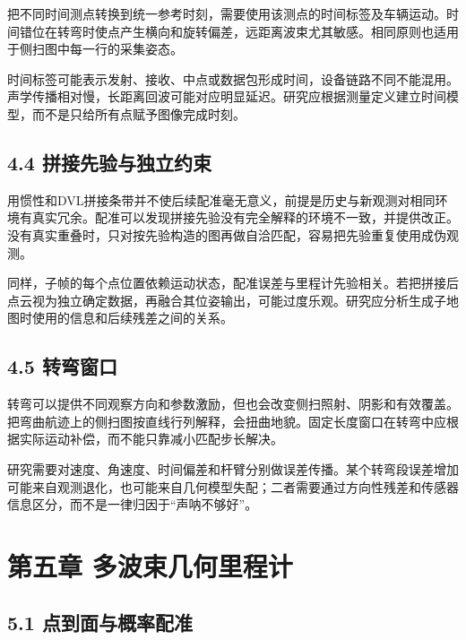 把不同时间测点转换到统一参考时刻，需要使用该测点的时间标签及车辆运动。时间错位在转弯时使点产生横向和旋转偏差，远距离波束尤其敏感。相同原则也适用于侧扫图中每一行的采集姿态。

时间标签可能表示发射、接收、中点或数据包形成时间，设备链路不同不能混用。声学传播相对慢，长距离回波可能对应明显延迟。研究应根据测量定义建立时间模型，而不是只给所有点赋予图像完成时刻。

\hypertarget{ux62fcux63a5ux5148ux9a8cux4e0eux72ecux7acbux7ea6ux675f}{%
\subsection{4.4 拼接先验与独立约束}\label{ux62fcux63a5ux5148ux9a8cux4e0eux72ecux7acbux7ea6ux675f}}

用惯性和DVL拼接条带并不使后续配准毫无意义，前提是历史与新观测对相同环境有真实冗余。配准可以发现拼接先验没有完全解释的环境不一致，并提供改正。没有真实重叠时，只对按先验构造的图再做自洽匹配，容易把先验重复使用成伪观测。

同样，子帧的每个点位置依赖运动状态，配准误差与里程计先验相关。若把拼接后点云视为独立确定数据，再融合其位姿输出，可能过度乐观。研究应分析生成子地图时使用的信息和后续残差之间的关系。

\hypertarget{ux8f6cux5f2fux7a97ux53e3}{%
\subsection{4.5 转弯窗口}\label{ux8f6cux5f2fux7a97ux53e3}}

转弯可以提供不同观察方向和参数激励，但也会改变侧扫照射、阴影和有效覆盖。把弯曲航迹上的侧扫图按直线行列解释，会扭曲地貌。固定长度窗口在转弯中应根据实际运动补偿，而不能只靠减小匹配步长解决。

研究需要对速度、角速度、时间偏差和杆臂分别做误差传播。某个转弯段误差增加可能来自观测退化，也可能来自几何模型失配；二者需要通过方向性残差和传感器信息区分，而不是一律归因于``声呐不够好''。

\hypertarget{ux7b2cux4e94ux7ae0-ux591aux6ce2ux675fux51e0ux4f55ux91ccux7a0bux8ba1}{%
\section{第五章 多波束几何里程计}\label{ux7b2cux4e94ux7ae0-ux591aux6ce2ux675fux51e0ux4f55ux91ccux7a0bux8ba1}}

\hypertarget{ux70b9ux5230ux9762ux4e0eux6982ux7387ux914dux51c6}{%
\subsection{5.1 点到面与概率配准}\label{ux70b9ux5230ux9762ux4e0eux6982ux7387ux914dux51c6}}

